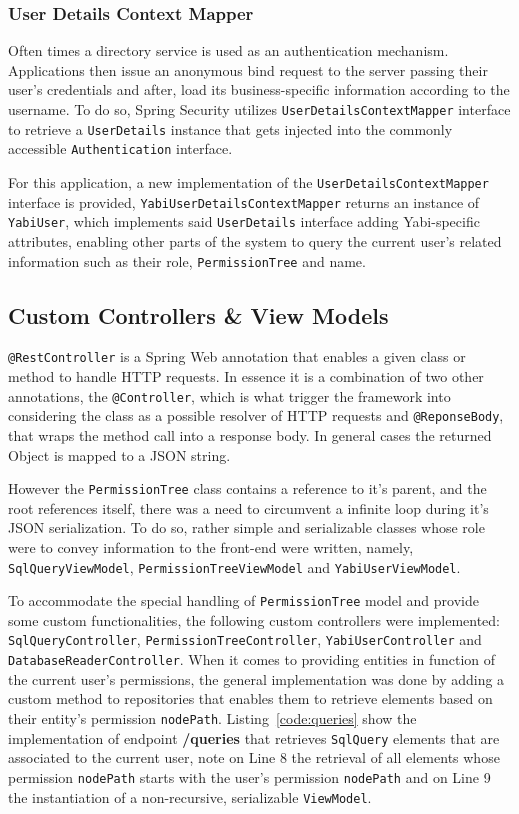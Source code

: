 \subsubsection{User Details Context Mapper}\label{impl:detailsmapper}
Often times a directory service is used as an authentication mechanism. Applications then issue an anonymous bind request to the server passing their user's credentials and after, load its business-specific information according to the username. To do so, Spring Security utilizes \texttt{UserDetailsContextMapper} interface to retrieve a \texttt{UserDetails} instance that gets injected into the commonly accessible \texttt{Authentication} interface.

For this application, a new implementation of the \texttt{UserDetailsContextMapper} interface is provided, \texttt{YabiUserDetailsContextMapper} returns an instance of \texttt{YabiUser}, which implements said \texttt{UserDetails} interface adding \gls{Yabi}-specific attributes, enabling other parts of the system to query the current user's related information such as their role, \texttt{PermissionTree} and name.

\subsection{Custom Controllers \& View Models}\label{s:ccevm}
\texttt{@RestController} is a Spring Web annotation that enables a given class or method to handle \gls{HTTP} requests. In essence it is a combination of two other annotations, the \texttt{@Controller}, which is what trigger the framework into considering the class as a possible resolver of  \gls{HTTP} requests and \texttt{@ReponseBody}, that wraps the method call into a response body. In general cases the returned Object is mapped to a \gls{JSON} string.

However the \texttt{PermissionTree} class contains a reference to it's parent, and the root references itself, there was a need to circumvent a infinite loop during it's \gls{JSON} serialization. To do so, rather simple and 
serializable classes whose role were to convey information to the front-end were written, namely, \texttt{SqlQueryViewModel}, \texttt{PermissionTreeViewModel} and \texttt{YabiUserViewModel}.

To accommodate the special handling of \texttt{PermissionTree} model and provide some custom functionalities, the following custom controllers were implemented: \texttt{SqlQueryController}, \texttt{PermissionTreeController}, \texttt{YabiUserController} and \texttt{DatabaseReaderController}. When it comes to providing entities in function of the current user's permissions, the general implementation was done by adding a custom method to repositories that enables them to retrieve elements based on their entity's permission \texttt{nodePath}. Listing~\ref{code:queries} show the implementation of endpoint \textbf{/queries} that retrieves \texttt{SqlQuery} elements that are associated to the current user, note on Line 8 the retrieval of all elements whose permission \texttt{nodePath} starts with the user's permission \texttt{nodePath} and on Line 9 the instantiation of a non-recursive, serializable \texttt{ViewModel}.

